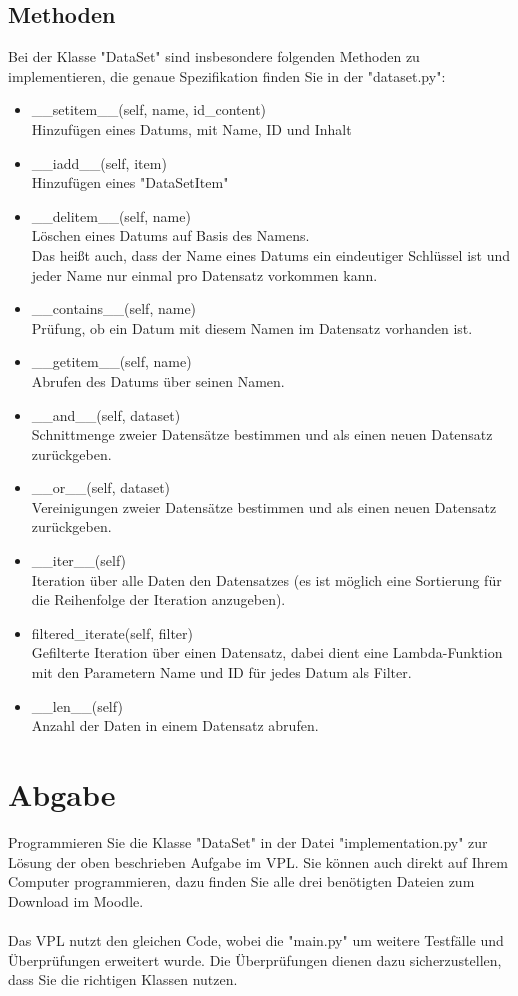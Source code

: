 \documentclass[]{scrartcl}
\begin{document}
\subsection{Methoden}
Bei der Klasse "DataSet" sind insbesondere folgenden Methoden zu implementieren, die genaue Spezifikation finden Sie in der "dataset.py":\\
\begin{itemize}
\item \_\_setitem\_\_(self, name, id\_content)\\
Hinzufügen eines Datums, mit Name, ID und Inhalt
\item \_\_iadd\_\_(self, item)\\
Hinzufügen eines "DataSetItem"
\item \_\_delitem\_\_(self, name)\\
Löschen eines Datums auf Basis des Namens.\\Das heißt auch, dass der Name eines Datums ein eindeutiger Schlüssel ist und jeder Name nur einmal pro Datensatz vorkommen kann.
\item \_\_contains\_\_(self, name)\\
Prüfung, ob ein Datum mit diesem Namen im Datensatz vorhanden ist.
\item \_\_getitem\_\_(self, name)\\
Abrufen des Datums über seinen Namen.
\item \_\_and\_\_(self, dataset)\\
Schnittmenge zweier Datensätze bestimmen und als einen neuen Datensatz zurückgeben.
\item \_\_or\_\_(self, dataset)\\
Vereinigungen zweier Datensätze bestimmen und als einen neuen Datensatz zurückgeben.
\item \_\_iter\_\_(self)\\
Iteration über alle Daten den Datensatzes (es ist möglich eine Sortierung für die Reihenfolge der Iteration anzugeben).
\item filtered\_iterate(self, filter)\\
Gefilterte Iteration über einen Datensatz, dabei dient eine Lambda-Funktion mit den Parametern Name und ID für jedes Datum als Filter.
\item \_\_len\_\_(self)\\
Anzahl der Daten in einem Datensatz abrufen.\\
\end{itemize}
\section{Abgabe}
Programmieren Sie die Klasse "DataSet" in der Datei "implementation.py" zur Lösung der oben beschrieben Aufgabe im VPL.
Sie können auch direkt auf Ihrem Computer programmieren, dazu finden Sie alle drei benötigten Dateien zum Download im Moodle.\\
\\
Das VPL nutzt den gleichen Code, wobei die "main.py" um weitere Testfälle und Überprüfungen erweitert wurde.
Die Überprüfungen dienen dazu sicherzustellen, dass Sie die richtigen Klassen nutzen.\\
\end{document}

